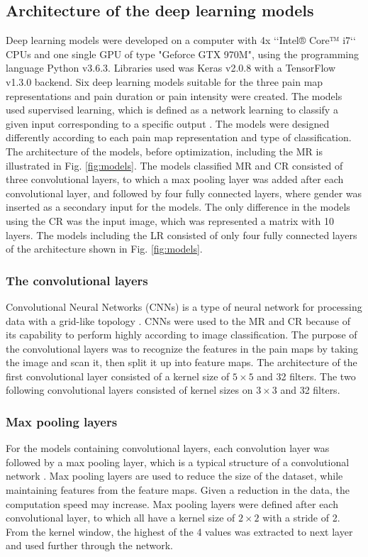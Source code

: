 \subsection{Architecture of the deep learning models}
Deep learning models were developed on a computer with 4x ‘‘Intel® Core™ i7‘‘ CPUs and one single GPU of type "Geforce GTX 970M", using the programming language Python v3.6.3. Libraries used was Keras v2.0.8 with a TensorFlow v1.3.0 backend.\newline
\noindent
Six deep learning models suitable for the three pain map representations and pain duration or pain intensity were created. The models used supervised learning, which is defined as a network learning to classify a given input corresponding to a specific output \citep{Goodfellow2016}. The models were designed differently according to each pain map representation and type of classification. The architecture of the models, before optimization, including the MR is illustrated in Fig. \ref{fig:models}. The models classified MR and CR consisted of three convolutional layers, to which a max pooling layer was added after each convolutional layer, and followed by four fully connected layers, where gender was inserted as a secondary input for the models. The only difference in the models using the CR was the input image, which was represented a matrix with 10 layers. 
The models including the LR consisted of only four fully connected layers of the architecture shown in Fig. \ref{fig:models}. 

\subsubsection{The convolutional layers}
Convolutional Neural Networks (CNNs) is a type of neural network for processing data with a grid-like topology \citep{Goodfellow2016}. CNNs were used to the MR and CR because of its capability to perform highly according to image classification. The purpose of the convolutional layers was to recognize the features in the pain maps by taking the image and scan it, then split it up into feature maps.\citep{Goodfellow2016,LeCun1998} The architecture of the first convolutional layer consisted of a kernel size of $5 \times 5$ and 32 filters. The two following convolutional layers consisted of kernel sizes on $3 \times 3$ and 32 filters. 

\subsubsection{Max pooling layers}
For the models containing convolutional layers, each convolution layer was followed by a max pooling layer, which is a typical structure of a convolutional network \citep{Goodfellow2016, LeCun2015}.
Max pooling layers are used to reduce the size of the dataset, while maintaining features from the feature maps. Given a reduction in the data, the computation speed may increase.\citep{Goodfellow2016,LeCun1998} 
Max pooling layers were defined after each convolutional layer, to which all have a kernel size of $2 \times 2$ with a stride of 2. From the kernel window, the highest of the 4 values was extracted to next layer and used further through the network. 

